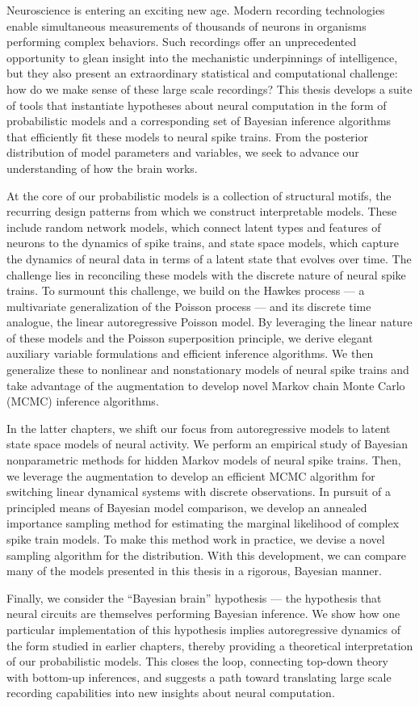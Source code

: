 Neuroscience is entering an exciting new age.  Modern recording
technologies enable simultaneous measurements of
thousands of neurons in organisms performing complex behaviors.  Such
recordings offer an unprecedented opportunity to glean insight into
the mechanistic underpinnings of intelligence, but they also present an
extraordinary statistical and computational challenge: how do we make
sense of these large scale recordings?
This thesis develops a suite of tools that instantiate
hypotheses about neural computation in the form of
probabilistic models and a corresponding set of Bayesian inference
algorithms that efficiently fit these models to neural spike trains.
From the posterior distribution of model parameters and variables,
we seek to advance our understanding of how the brain works. 


At the core of our probabilistic models is a collection of
structural motifs, the recurring design patterns from which we
construct interpretable models. These include random network models,
which connect latent types and features of neurons to the dynamics of
spike trains, and state space models, which capture the dynamics of
neural data in terms of a latent state that evolves over time.  The
challenge lies in reconciling these models with the
discrete nature of neural spike trains.  To surmount this challenge, 
we build on the Hawkes process --- a
multivariate generalization of the Poisson process --- and its
discrete time analogue, the linear autoregressive Poisson model.  By
leveraging the linear nature of these models and the Poisson
superposition principle, we derive elegant auxiliary variable
formulations and efficient inference algorithms. We then generalize
these to nonlinear and nonstationary models of neural spike trains and
take advantage of the \polyagamma augmentation to develop novel
Markov chain Monte Carlo (MCMC) inference algorithms.

In the latter chapters, we shift our focus from autoregressive models
to latent state space models of neural activity. We perform an
empirical study of Bayesian nonparametric methods for hidden Markov
models of neural spike trains. Then, we leverage the
\polyagamma augmentation to develop an efficient MCMC algorithm for
switching linear dynamical systems with discrete observations.  In
pursuit of a principled means of Bayesian model comparison, we develop
an annealed importance sampling method for estimating the marginal
likelihood of complex spike train models. To make this method work in
practice, we devise a novel sampling algorithm for the \polyagamma
distribution. With this development, we can compare many of the models
presented in this thesis in a rigorous, Bayesian manner.

Finally, we consider the ``Bayesian brain'' hypothesis --- the
hypothesis that neural circuits are themselves performing Bayesian
inference.  We show how one particular implementation of this
hypothesis implies autoregressive dynamics of the form studied
in earlier chapters, thereby providing a theoretical interpretation of
our probabilistic models.  This closes the
loop, connecting top-down theory with bottom-up inferences, and
suggests a path toward translating large scale recording
capabilities into new insights about neural computation.


